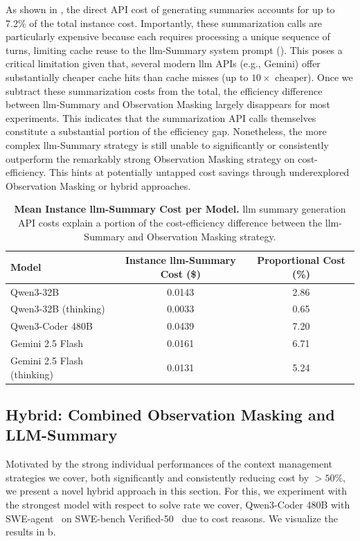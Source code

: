 \documentclass{article}
\begin{document}
As shown in , the direct API cost of generating summaries accounts for up to 7.2\% of the total instance cost. Importantly, these summarization calls are particularly expensive because each requires processing a unique sequence of turns, limiting cache reuse to the \ac{llm}-Summary system prompt (). This poses a critical limitation given that, several modern \ac{llm} APIs (e.g., Gemini) offer substantially cheaper cache hits than cache misses (up to $10\times$ cheaper). Once we subtract these summarization costs from the total, the efficiency difference between \ac{llm}-Summary and Observation Masking largely disappears for most experiments. This indicates that the summarization API calls themselves constitute a substantial portion of the efficiency gap. Nonetheless, the more complex \ac{llm}-Summary strategy is still unable to significantly or consistently outperform the remarkably strong Observation Masking strategy on cost-efficiency. This hints at potentially untapped cost savings through underexplored Observation Masking or hybrid approaches.

\begin{table}[ht]
  \caption{\textbf{Mean Instance \ac{llm}-Summary Cost per Model.} \ac{llm} summary generation API costs explain a portion of the cost-efficiency difference between the \ac{llm}-Summary and Observation Masking strategy.}
  \label{tab:summary_instance_costs}
  \centering
  \begin{tabular}{l S S[table-format=1.6]}
    \toprule
    \textbf{Model} & {\textbf{Instance \ac{llm}-Summary Cost (\$)}} & {\textbf{Proportional Cost (\%)}}\\
    \midrule
    Qwen3-32B & 0.0143 & 2.86\\
    Qwen3-32B (thinking) & 0.0033 & 0.65\\
    Qwen3-Coder 480B & 0.0439 & 7.20\\
    Gemini 2.5 Flash & 0.0161 & 6.71\\
    Gemini 2.5 Flash (thinking) & 0.0131 & 5.24 \\
    \bottomrule
  \end{tabular}
\end{table}

\subsection{Hybrid: Combined Observation Masking and LLM-Summary}
\label{subsec:discussion:hybrid}
Motivated by the strong individual performances of the context management strategies we cover, both significantly and consistently reducing cost by $>50\%$, we present a novel hybrid approach in this section. For this, we experiment with the strongest model with respect to solve rate we cover, Qwen3-Coder 480B with SWE-agent~\cite{yang_swe-agent_2024} on SWE-bench Verified-50~\cite{badertdinov2024scaling} due to cost reasons. We visualize the results in b.
\end{document}

